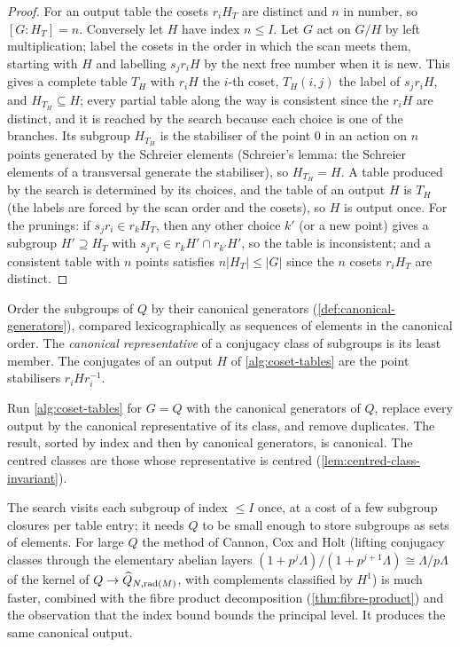 \begin{proof}
For an output table the cosets $r_iH_T$ are distinct and $n$ in number, so
$[G:H_T] = n$. Conversely let $H$ have index $n \leq I$. Let $G$ act on $G/H$ by
left multiplication; label the cosets in the order in which the scan meets
them, starting with $H$ and labelling $s_jr_iH$ by the next free number when
it is new. This gives a complete table $T_H$ with $r_iH$ the $i$-th coset,
$T_H(i,j)$ the label of $s_jr_iH$, and $H_{T_H} \subseteq H$; every partial
table along the way is consistent since the $r_iH$ are distinct, and it is
reached by the search because each choice is one of the branches. Its subgroup
$H_{T_H}$ is the stabiliser of the point $0$ in an action on $n$ points
generated by the Schreier elements (Schreier's lemma: the Schreier elements of
a transversal generate the stabiliser), so $H_{T_H} = H$. A table produced by the
search is determined by its choices, and the table of an output $H$ is $T_H$
(the labels are forced by the scan order and the cosets), so $H$ is output
once. For the prunings: if $s_jr_i \in r_kH_T$, then any other choice $k'$ (or a
new point) gives a subgroup $H' \supseteq H_T$ with $s_jr_i \in r_kH' \cap r_{k'}H'$,
so the table is inconsistent; and a consistent table with $n$ points satisfies
$n|H_T| \leq |G|$ since the $n$ cosets $r_iH_T$ are distinct.
\end{proof}

\begin{definition}\label{def:class-representative}
Order the subgroups of $Q$ by their canonical generators
(\cref{def:canonical-generators}), compared lexicographically as sequences of
elements in the canonical order. The \emph{canonical representative} of a
conjugacy class of subgroups is its least member. The conjugates of an output
$H$ of \cref{alg:coset-tables} are the point stabilisers $r_iHr_i^{-1}$.
\end{definition}

\begin{procedure}\label{alg:subgroup-classes}
Run \cref{alg:coset-tables} for $G = Q$ with the canonical generators of $Q$,
replace every output by the canonical representative of its class, and remove
duplicates. The result, sorted by index and then by canonical generators, is
canonical. The centred classes are those whose representative is centred
(\cref{lem:centred-class-invariant}).
\end{procedure}

\begin{remark}
The search visits each subgroup of index $\leq I$ once, at a cost of a few
subgroup closures per table entry; it needs $Q$ to be small enough to store
subgroups as sets of elements. For large $Q$ the method of Cannon, Cox and Holt
(lifting conjugacy classes through the elementary abelian layers
$(1 + p^j\Lambda)/(1 + p^{j+1}\Lambda) \cong \Lambda/p\Lambda$ of the kernel of
$Q \to \widehat{Q}_{N,\mathrm{rad}(M)}$, with complements classified by
$H^1$) is much faster, combined with the fibre product decomposition
(\cref{thm:fibre-product}) and the observation that the index bound bounds the
principal level. It produces the same canonical output.
\end{remark}
